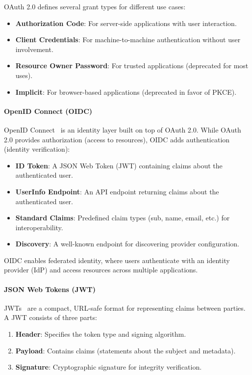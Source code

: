 OAuth 2.0 defines several grant types for different use cases:
\begin{itemize}
    \item \textbf{Authorization Code}: For server-side applications with user interaction.
    \item \textbf{Client Credentials}: For machine-to-machine authentication without user involvement.
    \item \textbf{Resource Owner Password}: For trusted applications (deprecated for most uses).
    \item \textbf{Implicit}: For browser-based applications (deprecated in favor of PKCE).
\end{itemize}

\paragraph{OpenID Connect (OIDC)}

OpenID Connect~%
is an identity layer built on top of OAuth 2.0. While OAuth 2.0 provides authorization (access to resources), OIDC adds authentication (identity verification):

\begin{itemize}
    \item \textbf{ID Token}: A JSON Web Token (JWT) containing claims about the authenticated user.
    \item \textbf{UserInfo Endpoint}: An API endpoint returning claims about the authenticated user.
    \item \textbf{Standard Claims}: Predefined claim types (sub, name, email, etc.) for interoperability.
    \item \textbf{Discovery}: A well-known endpoint for discovering provider configuration.
\end{itemize}

OIDC enables federated identity, where users authenticate with an identity provider (IdP) and access resources across multiple applications.

\paragraph{JSON Web Tokens (JWT)}

JWTs~%
are a compact, URL-safe format for representing claims between parties. A JWT consists of three parts:

\begin{enumerate}
    \item \textbf{Header}: Specifies the token type and signing algorithm.
    \item \textbf{Payload}: Contains claims (statements about the subject and metadata).
    \item \textbf{Signature}: Cryptographic signature for integrity verification.
\end{enumerate}

